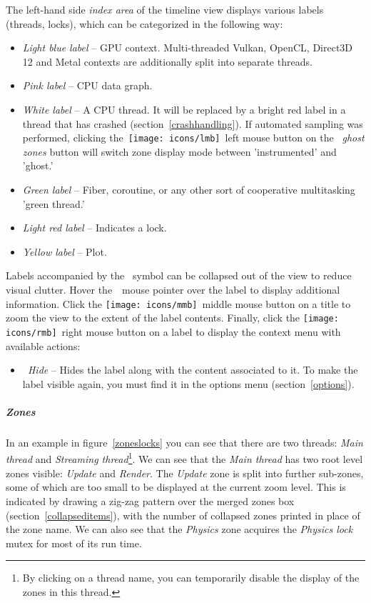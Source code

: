 \documentclass[hidelinks,titlepage,a4paper,twoside]{article}
\newcommand{\LMB}{\texttt{[image: icons/lmb]}}
\newcommand{\RMB}{\texttt{[image: icons/rmb]}}
\newcommand{\MMB}{\texttt{[image: icons/mmb]}}
\begin{document}
The left-hand side \emph{index area} of the timeline view displays various labels (threads, locks), which can be categorized in the following way:

\begin{itemize}
\item \emph{Light blue label} -- GPU context. Multi-threaded Vulkan, OpenCL, Direct3D 12 and Metal contexts are additionally split into separate threads.
\item \emph{Pink label} -- CPU data graph.
\item \emph{White label} -- A CPU thread. It will be replaced by a bright red label in a thread that has crashed (section~\ref{crashhandling}). If automated sampling was performed, clicking the~\LMB{}~left mouse button on the \emph{\faGhost{}~ghost zones} button will switch zone display mode between 'instrumented' and 'ghost.'
\item \emph{Green label} -- Fiber, coroutine, or any other sort of cooperative multitasking 'green thread.'
\item \emph{Light red label} -- Indicates a lock.
\item \emph{Yellow label} -- Plot.
\end{itemize}

Labels accompanied by the \faCaretDown{}~symbol can be collapsed out of the view to reduce visual clutter. Hover the~\faMousePointer{}~mouse pointer over the label to display additional information. Click the \MMB{}~middle mouse button on a title to zoom the view to the extent of the label contents. Finally, click the \RMB{}~right mouse button on a label to display the context menu with available actions:

\begin{itemize}
\item \emph{\faEyeSlash{}~Hide} -- Hides the label along with the content associated to it. To make the label visible again, you must find it in the options menu (section~\ref{options}).
\end{itemize}

\subparagraph{Zones}

In an example in figure~\ref{zoneslocks} you can see that there are two threads: \emph{Main thread} and \emph{Streaming thread}\footnote{By clicking on a thread name, you can temporarily disable the display of the zones in this thread.}. We can see that the \emph{Main thread} has two root level zones visible: \emph{Update} and \emph{Render}. The \emph{Update} zone is split into further sub-zones, some of which are too small to be displayed at the current zoom level. This is indicated by drawing a zig-zag pattern over the merged zones box (section~\ref{collapseditems}), with the number of collapsed zones printed in place of the zone name. We can also see that the \emph{Physics} zone acquires the \emph{Physics lock} mutex for most of its run time.
\end{document}
